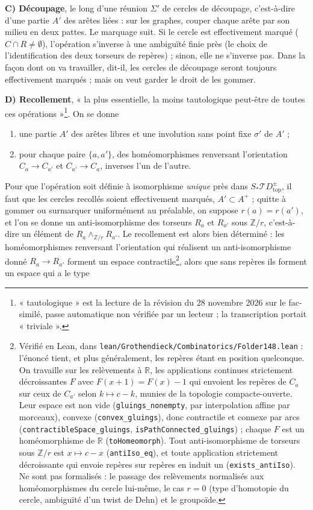 \documentclass[11pt,a4paper]{article}
\begin{document}
\textbf{C) Découpage}, le long d'une réunion $\Sigma'$ de cercles de découpage,
c'est-à-dire d'une partie $A'$ des arêtes liées : sur les graphes, couper chaque
arête par son milieu en deux pattes. Le marquage suit. Si le cercle est
effectivement marqué ($C \cap R \neq \emptyset$), l'opération s'inverse à une
ambiguïté finie près (le choix de l'identification des deux torseurs de
repères) ; sinon, elle ne s'inverse pas. Dans la façon dont on va travailler,
dit-il, les cercles de découpage seront toujours effectivement marqués ; mais on
veut garder le droit de les gommer.

\textbf{D) Recollement}, « la plus essentielle, la moins tautologique peut-être
de toutes ces opérations »\footnote{« tautologique » est la lecture de la
révision du 28 novembre 2026 sur le fac-similé, passe automatique non
vérifiée par un lecteur ; la transcription portait « triviale ».}. On se donne
\begin{enumerate}
\item[a)] une partie $A'$ des arêtes libres et une involution sans point fixe
$\sigma'$ de $A'$ ;
\item[b)] pour chaque paire $\{a, a'\}$, des homéomorphismes renversant
l'orientation $C_a \to C_{a'}$ et $C_{a'} \to C_a$, inverses l'un de l'autre.
\end{enumerate}
Pour que l'opération soit définie à isomorphisme \emph{unique} près dans
$S_{*}\mathcal{T}D^{\pm}_{\mathrm{top}}$, il faut que les cercles recollés soient
effectivement marqués, $A' \subset A^{+}$ ; quitte à gommer ou surmarquer
uniformément au préalable, on suppose $r(a) = r(a')$, et l'on se donne un
anti-isomorphisme des torseurs $R_a$ et $R_{a'}$ sous $\mathbb{Z}/r$,
c'est-à-dire un élément de $R_a \wedge_{\mathbb{Z}/r} R_{a'}$. Le recollement
est alors bien déterminé : les homéomorphismes renversant l'orientation qui
réalisent un anti-isomorphisme donné $R_a \to R_{a'}$ forment un espace
contractile\footnote{Vérifié en Lean, dans \texttt{lean/Grothendieck/Combinatorics/Folder148.lean}
: l'énoncé tient, et plus généralement, les repères étant en position
quelconque. On travaille sur les relèvements à $\mathbb{R}$, les applications
continues strictement décroissantes $F$ avec $F(x+1) = F(x) - 1$ qui envoient
les repères de $C_a$ sur ceux de $C_{a'}$ selon $k \mapsto c - k$, munies de la
topologie compacte-ouverte. Leur espace est non vide
(\texttt{gluings\_nonempty}, par interpolation affine par morceaux), convexe
(\texttt{convex\_gluings}), donc contractile et connexe par arcs
(\texttt{contractibleSpace\_gluings}, \texttt{isPathConnected\_gluings}) ; chaque
$F$ est un homéomorphisme de $\mathbb{R}$ (\texttt{toHomeomorph}). Tout
anti-isomorphisme de torseurs sous $\mathbb{Z}/r$ est $x \mapsto c - x$
(\texttt{antiIso\_eq}), et toute application strictement décroissante qui envoie
repères sur repères en induit un (\texttt{exists\_antiIso}). Ne sont pas
formalisés : le passage des relèvements normalisés aux homéomorphismes du cercle
lui-même, le cas $r = 0$ (type d'homotopie du cercle, ambiguïté d'un twist de
Dehn) et le groupoïde.}, alors que sans repères ils forment un espace qui a le type
\end{document}
